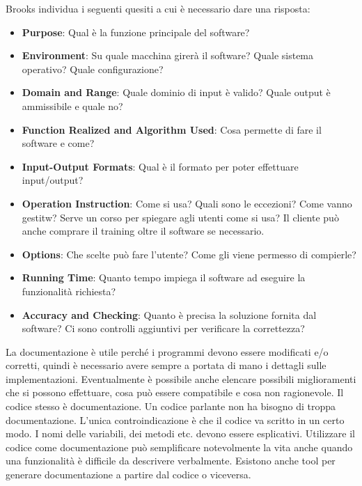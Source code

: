 Brooks individua i seguenti quesiti a cui è necessario dare una risposta:
\begin{itemize}
	\item \textbf{Purpose}: Qual è la funzione principale del software?
	\item \textbf{Environment}: Su quale macchina girerà il software? Quale sistema operativo? Quale configurazione?
	\item \textbf{Domain and Range}: Quale dominio di input è valido? Quale output è ammissibile e quale no?
	\item \textbf{Function Realized and Algorithm Used}: Cosa permette di fare il software e come?
	\item \textbf{Input-Output Formats}: Qual è il formato per poter effettuare input/output?
	\item \textbf{Operation Instruction}: Come si usa? Quali sono le eccezioni? Come vanno gestitw? Serve un corso per spiegare agli utenti come si usa? Il cliente può anche comprare il training oltre il software se necessario.
	\item \textbf{Options}: Che scelte può fare l'utente? Come gli viene permesso di compierle?
	\item \textbf{Running Time}: Quanto tempo impiega il software ad eseguire la funzionalità richiesta?
	\item \textbf{Accuracy and Checking}: Quanto è precisa la soluzione fornita dal software? Ci sono controlli aggiuntivi per verificare la correttezza?
\end{itemize}
La documentazione è utile perché i programmi devono essere modificati e/o corretti, quindi è necessario avere sempre a portata di mano i dettagli sulle implementazioni.\newline
Eventualmente è possibile anche elencare possibili miglioramenti che si possono effettuare, cosa può essere compatibile e cosa non ragionevole.\newline
Il codice stesso è documentazione. Un codice parlante non ha bisogno di troppa documentazione. L'unica controindicazione è che il codice va scritto in un certo modo. I nomi delle variabili, dei metodi etc. devono essere esplicativi. Utilizzare il codice come documentazione può semplificare notevolmente la vita anche quando una funzionalità è difficile da descrivere verbalmente. Esistono anche tool per generare documentazione a partire dal codice o viceversa.

